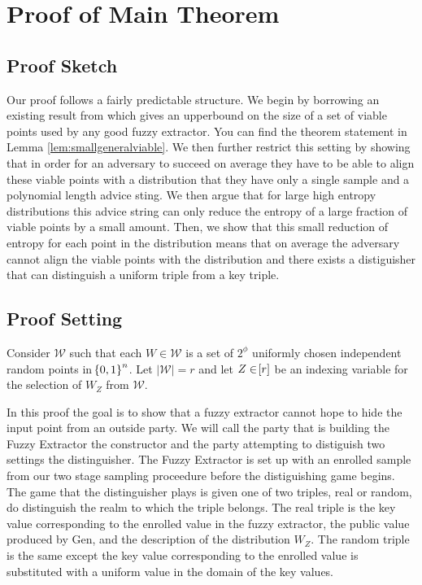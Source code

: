 
\section{Proof of Main Theorem}

\subsection{Proof Sketch}
Our proof follows a fairly predictable structure. 
We begin by borrowing an existing result from \cite{fuller2020fuzzy} which gives an upperbound on the size of a set of viable points used by any good fuzzy extractor. You can find the theorem statement in Lemma \ref{lem:smallgeneralviable}.
We then further restrict this setting by showing that in order for an adversary to succeed on average they have to be able to align these viable points with a distribution that they have only a single sample and a polynomial length advice sting. 
We then argue that for large high entropy distributions this advice string can only reduce the entropy of a large fraction of viable points by a small amount. 
Then, we show that this small reduction of entropy for each point in the distribution means that on average the adversary cannot align the viable points with the distribution and there exists a distiguisher that can distinguish a uniform triple from a key triple. 

\subsection{Proof Setting}
Consider $\mathcal{W}$ such that each $W \in \mathcal{W}$ is a set of $2^{\phi}$ uniformly chosen independent random points in $\!\left\{ 0,1 \right\}^{n}$. 
Let $|\mathcal{W}| = r$ and let $Z \in \!\left[r\right]$ be an indexing variable for the selection of $W_Z$ from $\mathcal{W}$. 

In this proof the goal is to show that a fuzzy extractor cannot hope to hide the input point from an outside party. 
We will call the party that is building the Fuzzy Extractor the constructor and the party attempting to distiguish two settings the distinguisher. 
The Fuzzy Extractor is set up with an enrolled sample from our two stage sampling proceedure before the distiguishing game begins.
The game that the distinguisher plays is given one of two triples, real or random, do distinguish the realm to which the triple belongs. 
The real triple is the key value corresponding to the enrolled value in the fuzzy extractor, the public value produced by Gen, and the description of the distribution $W_Z$.
The random triple is the same except the key value corresponding to the enrolled value is substituted with a uniform value in the domain of the key values.

